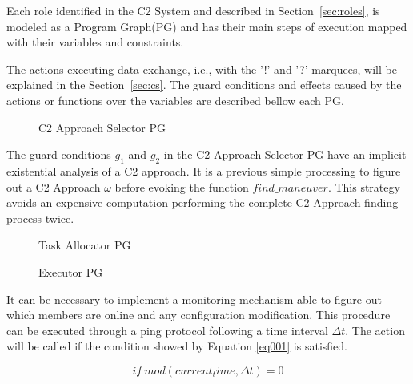 Each role identified in the C2 System and described in Section~\ref{sec:roles}, is modeled as a Program Graph(PG) and has their main steps of execution mapped with their variables and constraints.

The actions executing data exchange, i.e., with the '!' and '?' marquees, will be explained in the Section~\ref{sec:cs}. The guard conditions and effects caused by the actions or functions over the variables are described bellow each PG.

\begin{figure}[h!]
\centering
\label{PG001}
\scalebox{.8}{}
\caption{C2 Approach Selector PG}
\end{figure}

The guard conditions $g_1$ and $g_2$ in the C2 Approach Selector PG have an implicit existential analysis of a C2 approach. It is a previous simple processing to figure out a C2 Approach $\omega$ before evoking the function $find\_maneuver$. This strategy avoids an expensive computation performing the complete C2 Approach finding process twice.


\begin{figure}[h!]
\centering
\label{PG002}
\scalebox{.8}{}
\caption{Task Allocator PG}
\end{figure}


\begin{figure}[h!]
\centering
\label{PG003}
\scalebox{.8}{}
\caption{Executor PG}
\end{figure}

It can be necessary to implement a monitoring mechanism able to figure out which members are online and any configuration modification. This procedure can be executed through a ping protocol following a time interval $\Delta t$. The action will be called if the condition showed by Equation \ref{eq001} is satisfied.

\begin{center}
\begin{equation}
\label{eq001}
if\ mod(current_time, \Delta t)=0
\end{equation}
\end{center}